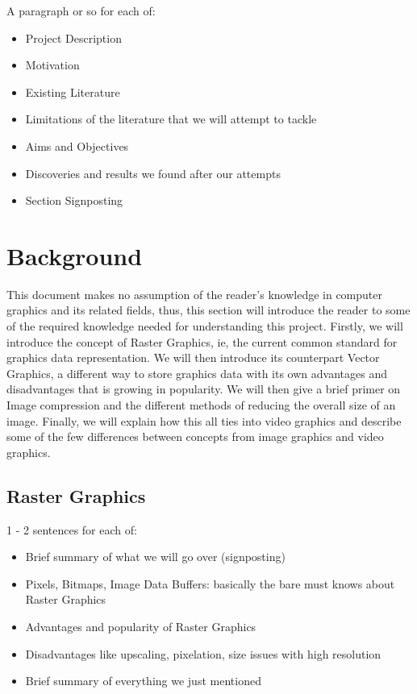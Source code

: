 \documentclass[12pt]{article}
\begin{document}
    A paragraph or so for each of:

    \begin{itemize}
        \item Project Description
        \item Motivation
        \item Existing Literature
        \item Limitations of the literature that we will attempt to tackle
        \item Aims and Objectives
        \item Discoveries and results we found after our attempts
        \item Section Signposting
    \end{itemize}

    \pagebreak


    \section{Background}\label{sec:background}

    \tab
    This document makes no assumption of the reader's knowledge in computer graphics and its related fields,
    thus, this section will introduce the reader to some of the required knowledge needed for understanding this
    project.
    Firstly, we will introduce the concept of Raster Graphics, ie, the current common standard for graphics data
    representation.
    We will then introduce its counterpart Vector Graphics, a different way to store graphics data with its own
    advantages and disadvantages that is growing in popularity.
    We will then give a brief primer on Image compression and the different methods of reducing the overall size
    of an image.
    Finally, we will explain how this all ties into video graphics and describe some of the few differences between
    concepts from image graphics and video graphics.

    \subsection{Raster Graphics}\label{subsec:raster-graphics}

    1 - 2 sentences for each of:

    \begin{itemize}
        \item Brief summary of what we will go over (signposting)
        \item Pixels, Bitmaps, Image Data Buffers: basically the bare must knows about Raster Graphics
        \item Advantages and popularity of Raster Graphics
        \item Disadvantages like upscaling, pixelation, size issues with high resolution
        \item Brief summary of everything we just mentioned
    \end{itemize}
\end{document}
